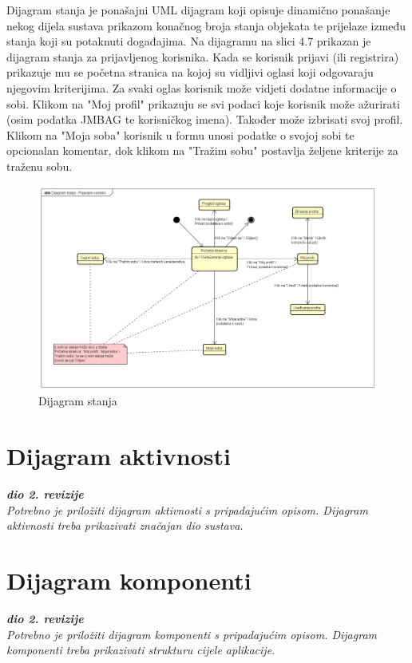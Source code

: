 		
		Dijagram stanja je ponašajni UML dijagram koji opisuje dinamično ponašanje nekog dijela sustava prikazom konačnog broja stanja objekata te prijelaze između stanja koji su potaknuti događajima. Na dijagramu na slici 4.7 prikazan je dijagram stanja za prijavljenog korisnika. Kada se korisnik prijavi (ili registrira) prikazuje mu se početna stranica na kojoj su vidljivi oglasi koji odgovaraju njegovim kriterijima. Za svaki oglas korisnik može vidjeti dodatne informacije o sobi. Klikom na "Moj profil" prikazuju se svi podaci koje korisnik može ažurirati (osim podatka JMBAG te korisničkog imena). Također može izbrisati svoj profil. Klikom na "Moja soba" korisnik u formu unosi podatke o svojoj sobi te opcionalan komentar, dok klikom na "Tražim sobu" postavlja željene kriterije za traženu sobu.
		
		\begin{figure}[H]
			\includegraphics[scale=0.4]{dijagrami/dijagramStanja} %
			\centering
			\caption{Dijagram stanja}
			\label{fig:dijagramStanja}
		\end{figure}
		
		
		\eject 
		
		\section{Dijagram aktivnosti}
		
		\textbf{\textit{dio 2. revizije}}\\
		
		\textit{Potrebno je priložiti dijagram aktivnosti s pripadajućim opisom. Dijagram aktivnosti treba prikazivati značajan dio sustava.}
		
		\eject
		\section{Dijagram komponenti}
		
		\textbf{\textit{dio 2. revizije}}\\
		
		\textit{Potrebno je priložiti dijagram komponenti s pripadajućim opisom. Dijagram komponenti treba prikazivati strukturu cijele aplikacije.}
		
		
